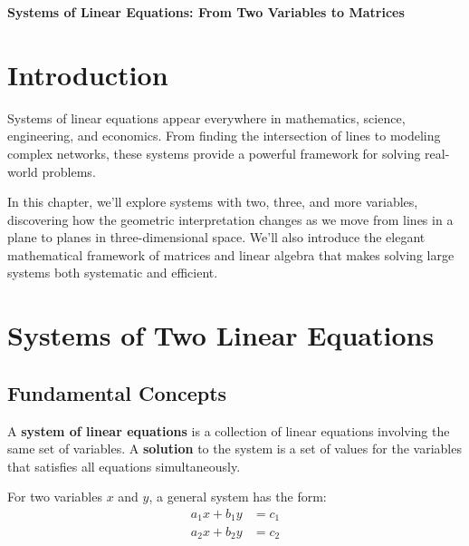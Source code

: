 \documentclass[12pt]{article}
\begin{document}
\begin{center}
\textbf{\Large Systems of Linear Equations: From Two Variables to Matrices} \\
\vspace{0.5cm}
\hspace{0.1\textwidth}
\end{center}

\vspace{0.5cm}

\section{Introduction}

Systems of linear equations appear everywhere in mathematics, science, engineering, and economics. From finding the intersection of lines to modeling complex networks, these systems provide a powerful framework for solving real-world problems.

In this chapter, we'll explore systems with two, three, and more variables, discovering how the geometric interpretation changes as we move from lines in a plane to planes in three-dimensional space. We'll also introduce the elegant mathematical framework of matrices and linear algebra that makes solving large systems both systematic and efficient.

\section{Systems of Two Linear Equations}

\subsection{Fundamental Concepts}

A \textbf{system of linear equations} is a collection of linear equations involving the same set of variables. A \textbf{solution} to the system is a set of values for the variables that satisfies all equations simultaneously.

For two variables $x$ and $y$, a general system has the form:
\begin{align}
a_1x + b_1y &= c_1 \\
a_2x + b_2y &= c_2
\end{align}
\end{document}
